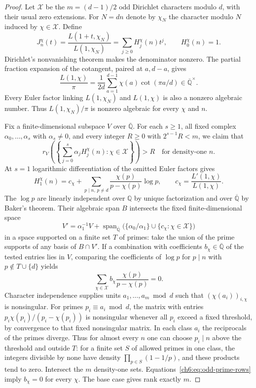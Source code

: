\documentclass[11pt,a4paper,oneside,openany]{report}
\theoremstyle{remark}\newtheorem{remark}[theorem]{Remark}
\numberwithin{equation}{section}
\begin{document}
\begin{proof}
Let $\mathcal X$ be the $m=(d-1)/2$ odd Dirichlet characters modulo
$d$, with their usual zero extensions. For $N=dn$ denote by $\chi_N$
the character modulo $N$ induced by $\chi\in\mathcal X$. Define
\[
 J_n^\chi(t)=\frac{L(1+t,\chi_N)}{L(1,\chi_N)}
  =\sum_{j\ge0}H_j^\chi(n)t^j,\qquad H_0^\chi(n)=1.
\]
Dirichlet's nonvanishing theorem \cite{dav} makes the denominator nonzero. The
partial fraction expansion of the cotangent, paired at $a,d-a$, gives
\[
 \frac{L(1,\chi)}{\pi}=\frac1{2d}\sum_{a=1}^{d-1}\chi(a)
 \cot(\pi a/d)\in\overline{\mathbb Q}^{\times}.
\]
Every Euler factor linking $L(1,\chi_N)$ and $L(1,\chi)$ is also a
nonzero algebraic number. Thus $L(1,\chi_N)/\pi$ is nonzero algebraic
for every $\chi$ and $n$.

Fix a finite-dimensional subspace $V$ over $\overline{\mathbb Q}$.
For each $s\ge1$, all fixed complex $\alpha_0,\ldots,\alpha_s$ with
$\alpha_s\ne0$, and every integer $R\ge0$ with $2^{s-1}R<m$, we claim
that
\begin{equation}\label{ch6:eq:odd-jet-rank-claim}
 r_V\left(\left\{\sum_{j=0}^s\alpha_j H_j^\chi(n):
                                  \chi\in\mathcal X\right\}\right)>R
 \quad\text{for density-one }n.
\end{equation}
At $s=1$ logarithmic differentiation of the omitted Euler factors gives
\[
 H_1^\chi(n)=c_\chi+\sum_{p\mid n,\,p\ne d}
       \frac{\chi(p)}{p-\chi(p)}\log p,
 \qquad c_\chi=\frac{L'(1,\chi)}{L(1,\chi)}.
\]
The $\log p$ are linearly independent over $\mathbb Q$ by unique
factorization and over $\overline{\mathbb Q}$ by Baker's theorem. Their
algebraic span $B$ intersects the fixed finite-dimensional space
\[
 V'=\alpha_1^{-1}V+\operatorname{span}_{\overline{\mathbb Q}}
       \big(\{\alpha_0/\alpha_1\}\cup\{c_\chi:\chi\in\mathcal X\}\big)
\]
in a space supported on a finite set $T$ of primes: take the union of
the prime supports of any basis of $B\cap V'$. If a combination with
coefficients $b_\chi\in\overline{\mathbb Q}$ of the tested entries lies
in $V$, comparing the coefficients of $\log p$ for $p\mid n$ with
$p\notin T\cup\{d\}$ yields
\begin{equation}\label{ch6:eq:odd-prime-rows}
 \sum_{\chi\in\mathcal X} b_\chi\frac{\chi(p)}{p-\chi(p)}=0.
\end{equation}
Character independence supplies units $a_1,\ldots,a_m\bmod d$ such
that $(\chi(a_i))_{i,\chi}$ is nonsingular. For primes
$p_i\equiv a_i\bmod d$, the matrix with entries
$p_i\chi(p_i)/(p_i-\chi(p_i))$ is nonsingular whenever all $p_i$ exceed
a fixed threshold, by convergence to that fixed nonsingular matrix.
In each class $a_i$ the reciprocals of the primes diverge. Thus for
almost every $n$ one can choose $p_i\mid n$ above the threshold and
outside $T$: for a finite set $S$ of allowed primes in one class,
the integers divisible by none have density $\prod_{p\in S}(1-1/p)$,
and these products tend to zero. Intersect the $m$ density-one sets.
Equations~\eqref{ch6:eq:odd-prime-rows} imply $b_\chi=0$ for every $\chi$.
The base case gives rank exactly $m$.


\end{proof}
\end{document}
